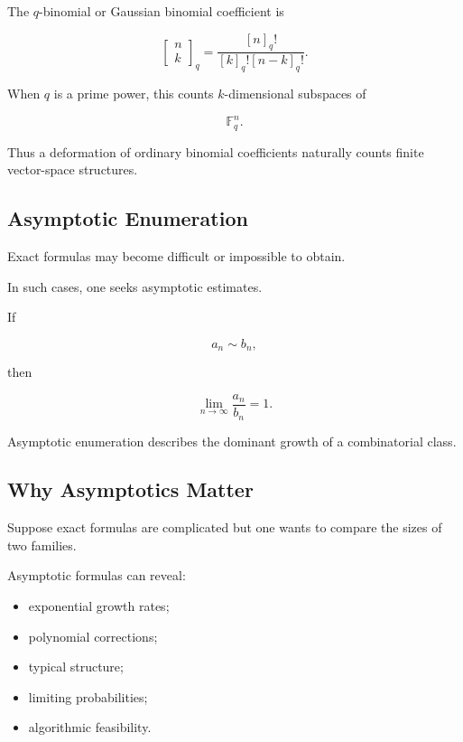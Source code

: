 The \(q\)-binomial or Gaussian binomial coefficient is

\[
\boxed{
\begin{bmatrix}
n\\
k
\end{bmatrix}_q
=
\frac{
[n]_q!
}{
[k]_q![n-k]_q!
}.
}
\]

When \(q\) is a prime power, this counts \(k\)-dimensional subspaces of

\[
\mathbb{F}_q^n.
\]

Thus a deformation of ordinary binomial coefficients naturally counts
finite vector-space structures.

\subsection{Asymptotic Enumeration}
\label{subsec:asymptotic-enumeration}

Exact formulas may become difficult or impossible to obtain.

In such cases, one seeks asymptotic estimates.

If

\[
a_n\sim b_n,
\]

then

\[
\boxed{
\lim_{n\to\infty}
\frac{a_n}{b_n}
=
1.
}
\]

Asymptotic enumeration describes the dominant growth of a combinatorial
class.

\subsection{Why Asymptotics Matter}
\label{subsec:why-asymptotics-matter}

Suppose exact formulas are complicated but one wants to compare the
sizes of two families.

Asymptotic formulas can reveal:

\begin{itemize}
    \item exponential growth rates;
    \item polynomial corrections;
    \item typical structure;
    \item limiting probabilities;
    \item algorithmic feasibility.
\end{itemize}

